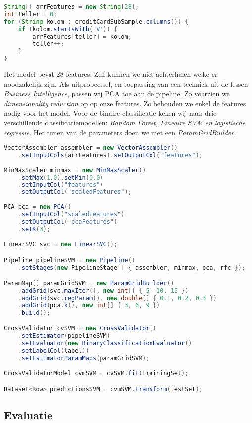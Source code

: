 \documentclass[a4paper,10pt,twoside]{report}
\begin{document}
\begin{lstlisting}[language=Java]
String[] arrFeatures = new String[28];
int teller = 0;
for (String kolom : creditCardSubSample.columns()) {
	if (kolom.startsWith("V")) {
		arrFeatures[teller] = kolom;
		teller++;
	}
}
\end{lstlisting}

Het model bevat 28 features. Zelf kunnen we niet achterhalen welke er noodzakelijk zijn. Als uitprobeersel, en toepassing van een techniek uit de lessen \textit{Business Intelligence}, passen wij PCA toe aan de pipeline. Zo voorzien we \textit{dimensionality reduction} op op onze features. Zo behouden we enkel de features nodig voor het model. Voor de binaire classificatie keken wij naar drie verschillende classificatiemodellen: \textit{Random Forest, Lineaire SVM en logistische regressie}. Het tunen van de parameters doen we met een \textit{ParamGridBuilder}. 

\begin{lstlisting}[language=Java]
VectorAssembler assembler = new VectorAssembler()
	.setInputCols(arrFeatures).setOutputCol("features");
	
MinMaxScaler minmax = new MinMaxScaler()
	.setMax(1.0).setMin(0.0)
	.setInputCol("features")
	.setOutputCol("scaledFeatures");
	
PCA pca = new PCA()
	.setInputCol("scaledFeatures")
	.setOutputCol("pcaFeatures")
	.setK(3);

LinearSVC svc = new LinearSVC();

Pipeline pipelineSVM = new Pipeline()
	.setStages(new PipelineStage[] { assembler, minmax, pca, rfc });

ParamMap[] paramGridSVM = new ParamGridBuilder()
	.addGrid(svc.maxIter(), new int[] { 5, 10, 15 })
	.addGrid(svc.regParam(), new double[] { 0.1, 0.2, 0.3 })
	.addGrid(pca.k(), new int[] { 3, 6, 9 })
	.build();

CrossValidator cvSVM = new CrossValidator()
	.setEstimator(pipelineSVM)
	.setEvaluator(new BinaryClassificationEvaluator()
	.setLabelCol(label))
	.setEstimatorParamMaps(paramGridSVM);

CrossValidatorModel cvmSVM = cvSVM.fit(trainingSet);

Dataset<Row> predictionsSVM = cvmSVM.transform(testSet);
\end{lstlisting}

\newpage

\subsection*{Evaluatie}
\end{document}
